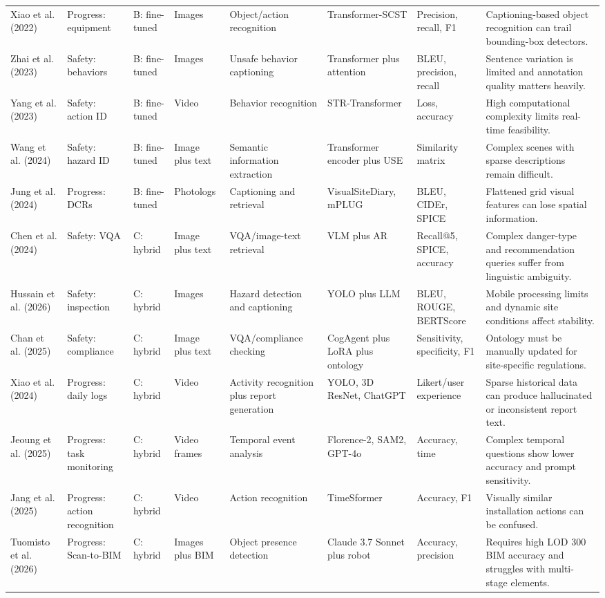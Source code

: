 \documentclass[10pt,letterpaper]{article}
\begin{document}
\begin{landscape}
\begin{longtable}{L{2.9cm} L{2.4cm} L{1.6cm} L{1.8cm} L{2.4cm} L{2.7cm} L{2.2cm} L{4.9cm}}
Xiao et al. (2022) & Progress: equipment & B: fine-tuned & Images & Object/action recognition & Transformer-SCST & Precision, recall, F1 & Captioning-based object recognition can trail bounding-box detectors.\\
Zhai et al. (2023) & Safety: behaviors & B: fine-tuned & Images & Unsafe behavior captioning & Transformer plus attention & BLEU, precision, recall & Sentence variation is limited and annotation quality matters heavily.\\
Yang et al. (2023) & Safety: action ID & B: fine-tuned & Video & Behavior recognition & STR-Transformer & Loss, accuracy & High computational complexity limits real-time feasibility.\\
Wang et al. (2024) & Safety: hazard ID & B: fine-tuned & Image plus text & Semantic information extraction & Transformer encoder plus USE & Similarity matrix & Complex scenes with sparse descriptions remain difficult.\\
Jung et al. (2024) & Progress: DCRs & B: fine-tuned & Photologs & Captioning and retrieval & VisualSiteDiary, mPLUG & BLEU, CIDEr, SPICE & Flattened grid visual features can lose spatial information.\\
Chen et al. (2024) & Safety: VQA & C: hybrid & Image plus text & VQA/image-text retrieval & VLM plus AR & Recall@5, SPICE, accuracy & Complex danger-type and recommendation queries suffer from linguistic ambiguity.\\
Hussain et al. (2026) & Safety: inspection & C: hybrid & Images & Hazard detection and captioning & YOLO plus LLM & BLEU, ROUGE, BERTScore & Mobile processing limits and dynamic site conditions affect stability.\\
Chan et al. (2025) & Safety: compliance & C: hybrid & Image plus text & VQA/compliance checking & CogAgent plus LoRA plus ontology & Sensitivity, specificity, F1 & Ontology must be manually updated for site-specific regulations.\\
Xiao et al. (2024) & Progress: daily logs & C: hybrid & Video & Activity recognition plus report generation & YOLO, 3D ResNet, ChatGPT & Likert/user experience & Sparse historical data can produce hallucinated or inconsistent report text.\\
Jeoung et al. (2025) & Progress: task monitoring & C: hybrid & Video frames & Temporal event analysis & Florence-2, SAM2, GPT-4o & Accuracy, time & Complex temporal questions show lower accuracy and prompt sensitivity.\\
Jang et al. (2025) & Progress: action recognition & C: hybrid & Video & Action recognition & TimeSformer & Accuracy, F1 & Visually similar installation actions can be confused.\\
Tuomisto et al. (2026) & Progress: Scan-to-BIM & C: hybrid & Images plus BIM & Object presence detection & Claude 3.7 Sonnet plus robot & Accuracy, precision & Requires high LOD 300 BIM accuracy and struggles with multi-stage elements.\\
\end{longtable}
\end{landscape}
\end{document}
